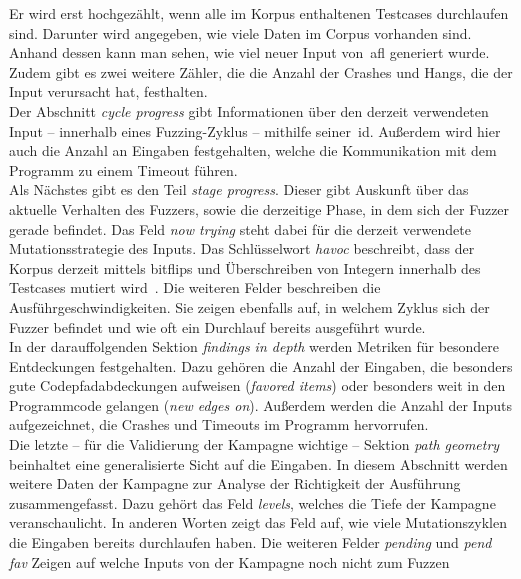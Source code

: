 Er wird erst hochgezählt, wenn alle im Korpus enthaltenen Testcases durchlaufen sind.
Darunter wird angegeben, wie viele Daten im Corpus vorhanden sind.
Anhand dessen kann man sehen, wie viel neuer Input von~\gls{afl} generiert wurde.
Zudem gibt es zwei weitere Zähler, die die Anzahl der Crashes und Hangs, die der Input verursacht hat, festhalten. \\
\linebreak
Der Abschnitt \textit{cycle progress} gibt Informationen über den derzeit verwendeten Input -- innerhalb eines Fuzzing-Zyklus --
mithilfe seiner~\gls{id}.
Außerdem wird hier auch die Anzahl an Eingaben festgehalten, welche die Kommunikation mit dem Programm zu einem Timeout führen.\\
\linebreak
Als Nächstes gibt es den Teil \textit{stage progress}.
Dieser gibt Auskunft über das aktuelle Verhalten des Fuzzers, sowie die derzeitige Phase, in dem sich der Fuzzer gerade befindet.
Das Feld \textit{now trying} steht dabei für die derzeit verwendete Mutationsstrategie des Inputs.
Das Schlüsselwort \textit{havoc} beschreibt, dass der Korpus derzeit mittels bitflips und Überschreiben von Integern innerhalb des
Testcases mutiert wird~\cite{stage-progress}.
Die weiteren Felder beschreiben die Ausführgeschwindigkeiten.
Sie zeigen ebenfalls auf, in welchem Zyklus sich der Fuzzer befindet und wie oft ein Durchlauf bereits ausgeführt wurde.\\
\linebreak
In der darauffolgenden Sektion \textit{findings in depth} werden Metriken für besondere Entdeckungen festgehalten.
Dazu gehören die Anzahl der Eingaben, die besonders gute Codepfadabdeckungen aufweisen (\textit{favored items}) oder besonders
weit in den Programmcode gelangen (\textit{new edges on}).
Außerdem werden die Anzahl der Inputs aufgezeichnet, die Crashes und Timeouts im Programm hervorrufen. \\
\linebreak
Die letzte -- für die Validierung der Kampagne wichtige -- Sektion \textit{path geometry} beinhaltet eine generalisierte Sicht
auf die Eingaben.
In diesem Abschnitt werden weitere Daten der Kampagne zur Analyse der Richtigkeit der Ausführung zusammengefasst.
Dazu gehört das Feld \textit{levels}, welches die Tiefe der Kampagne veranschaulicht.
In anderen Worten zeigt das Feld auf, wie viele Mutationszyklen die Eingaben bereits durchlaufen haben.
Die weiteren Felder \textit{pending} und \textit{pend fav} Zeigen auf welche Inputs von der Kampagne noch nicht zum Fuzzen

